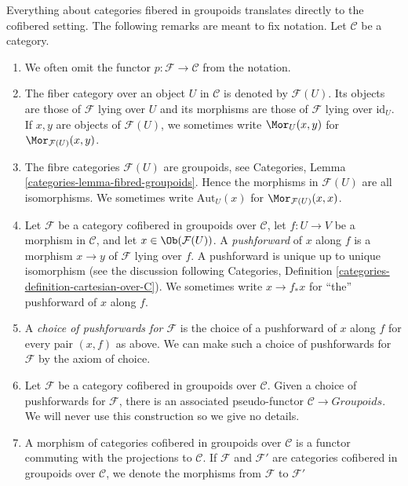 \begin{remarks}
\label{remarks-cofibered-groupoids}
Everything about categories fibered in groupoids translates directly to the
cofibered setting. The following remarks are meant to fix notation.
Let $\mathcal{C}$ be a category.
\begin{enumerate}
\item We often omit the functor $p: \mathcal{F} \to \mathcal{C}$ from the
notation.
\item The fiber category over an object $U$ in $\mathcal{C}$ is denoted by
$\mathcal{F}(U)$. Its objects are those of $\mathcal{F}$ lying over $U$ and its
morphisms are those of $\mathcal{F}$ lying over $\text{id}_U$.
If $x, y$  are objects of $\mathcal{F}(U)$, we sometimes write
$\Mor_U(x, y)$ for $\Mor_{\mathcal{F}(U)}(x, y)$.
\item The fibre categories $\mathcal{F}(U)$ are groupoids, see
Categories, Lemma \ref{categories-lemma-fibred-groupoids}.
Hence the morphisms in $\mathcal{F}(U)$ are all isomorphisms.
We sometimes write $\text{Aut}_U(x)$ for $\Mor_{\mathcal{F}(U)}(x, x)$.
\item
\label{formal-defos-item-pushforward}
Let $\mathcal{F}$ be a category cofibered in groupoids over
$\mathcal{C}$, let $f: U \to V$ be a morphism in $\mathcal{C}$, and
let $x \in \Ob(\mathcal{F}(U))$.
A {\it pushforward} of $x$ along $f$ is a morphism
$x \to y$ of $\mathcal{F}$ lying over $f$. A pushforward
is unique up to unique isomorphism (see the discussion following
Categories, Definition \ref{categories-definition-cartesian-over-C}).
We sometimes write $x \to f_*x$ for ``the'' pushforward of $x$
along $f$.
\item A {\it choice of pushforwards for $\mathcal{F}$} is the choice of
a pushforward of $x$ along $f$ for every pair $(x, f)$ as above. We can make
such a choice of pushforwards for $\mathcal{F}$ by the axiom of choice.
\item Let $\mathcal{F}$ be a category cofibered in groupoids over
$\mathcal{C}$. Given a choice of pushforwards for $\mathcal{F}$, there
is an associated pseudo-functor $\mathcal{C} \to \textit{Groupoids}$.
We will never use this construction so we give no details.
\item
\label{formal-defos-item-cofibered-morphism}
A morphism of categories cofibered in groupoids over $\mathcal{C}$ is a
functor commuting with the projections to $\mathcal{C}$. If $\mathcal{F}$
and $\mathcal{F}'$ are categories cofibered in groupoids over
$\mathcal{C}$, we denote the morphisms from $\mathcal{F}$ to $\mathcal{F}'$

\end{enumerate}
\end{remarks}
